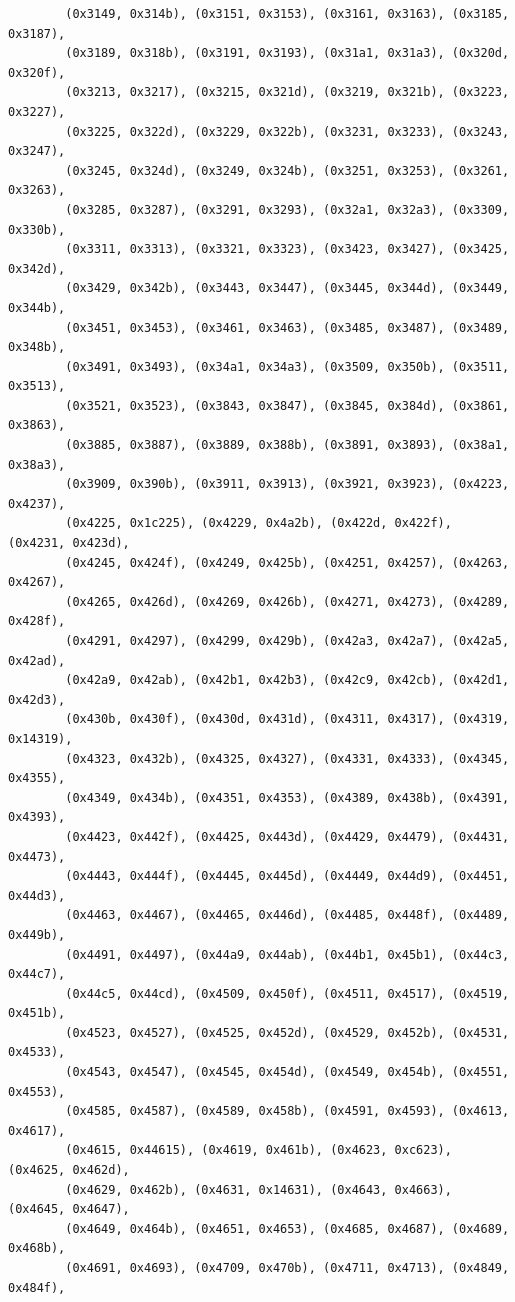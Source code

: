 \documentclass[11pt,a4paper]{article}
\begin{document}
\begin{lstlisting}
        (0x3149, 0x314b), (0x3151, 0x3153), (0x3161, 0x3163), (0x3185, 0x3187),
        (0x3189, 0x318b), (0x3191, 0x3193), (0x31a1, 0x31a3), (0x320d, 0x320f),
        (0x3213, 0x3217), (0x3215, 0x321d), (0x3219, 0x321b), (0x3223, 0x3227),
        (0x3225, 0x322d), (0x3229, 0x322b), (0x3231, 0x3233), (0x3243, 0x3247),
        (0x3245, 0x324d), (0x3249, 0x324b), (0x3251, 0x3253), (0x3261, 0x3263),
        (0x3285, 0x3287), (0x3291, 0x3293), (0x32a1, 0x32a3), (0x3309, 0x330b),
        (0x3311, 0x3313), (0x3321, 0x3323), (0x3423, 0x3427), (0x3425, 0x342d),
        (0x3429, 0x342b), (0x3443, 0x3447), (0x3445, 0x344d), (0x3449, 0x344b),
        (0x3451, 0x3453), (0x3461, 0x3463), (0x3485, 0x3487), (0x3489, 0x348b),
        (0x3491, 0x3493), (0x34a1, 0x34a3), (0x3509, 0x350b), (0x3511, 0x3513),
        (0x3521, 0x3523), (0x3843, 0x3847), (0x3845, 0x384d), (0x3861, 0x3863),
        (0x3885, 0x3887), (0x3889, 0x388b), (0x3891, 0x3893), (0x38a1, 0x38a3),
        (0x3909, 0x390b), (0x3911, 0x3913), (0x3921, 0x3923), (0x4223, 0x4237),
        (0x4225, 0x1c225), (0x4229, 0x4a2b), (0x422d, 0x422f), (0x4231, 0x423d),
        (0x4245, 0x424f), (0x4249, 0x425b), (0x4251, 0x4257), (0x4263, 0x4267),
        (0x4265, 0x426d), (0x4269, 0x426b), (0x4271, 0x4273), (0x4289, 0x428f),
        (0x4291, 0x4297), (0x4299, 0x429b), (0x42a3, 0x42a7), (0x42a5, 0x42ad),
        (0x42a9, 0x42ab), (0x42b1, 0x42b3), (0x42c9, 0x42cb), (0x42d1, 0x42d3),
        (0x430b, 0x430f), (0x430d, 0x431d), (0x4311, 0x4317), (0x4319, 0x14319),
        (0x4323, 0x432b), (0x4325, 0x4327), (0x4331, 0x4333), (0x4345, 0x4355),
        (0x4349, 0x434b), (0x4351, 0x4353), (0x4389, 0x438b), (0x4391, 0x4393),
        (0x4423, 0x442f), (0x4425, 0x443d), (0x4429, 0x4479), (0x4431, 0x4473),
        (0x4443, 0x444f), (0x4445, 0x445d), (0x4449, 0x44d9), (0x4451, 0x44d3),
        (0x4463, 0x4467), (0x4465, 0x446d), (0x4485, 0x448f), (0x4489, 0x449b),
        (0x4491, 0x4497), (0x44a9, 0x44ab), (0x44b1, 0x45b1), (0x44c3, 0x44c7),
        (0x44c5, 0x44cd), (0x4509, 0x450f), (0x4511, 0x4517), (0x4519, 0x451b),
        (0x4523, 0x4527), (0x4525, 0x452d), (0x4529, 0x452b), (0x4531, 0x4533),
        (0x4543, 0x4547), (0x4545, 0x454d), (0x4549, 0x454b), (0x4551, 0x4553),
        (0x4585, 0x4587), (0x4589, 0x458b), (0x4591, 0x4593), (0x4613, 0x4617),
        (0x4615, 0x44615), (0x4619, 0x461b), (0x4623, 0xc623), (0x4625, 0x462d),
        (0x4629, 0x462b), (0x4631, 0x14631), (0x4643, 0x4663), (0x4645, 0x4647),
        (0x4649, 0x464b), (0x4651, 0x4653), (0x4685, 0x4687), (0x4689, 0x468b),
        (0x4691, 0x4693), (0x4709, 0x470b), (0x4711, 0x4713), (0x4849, 0x484f),

\end{lstlisting}
\end{document}
